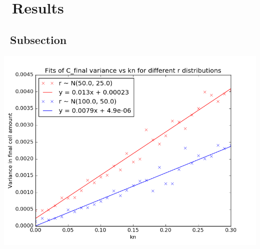 \graphicspath{{images/}}

\section{\thesection~Results}
\label{sec:results}
\citep{palkova1997}

\subsection{\thesubsection~Subsection}


\graphicspath{{images/guessing/}}
\begin{Figure}
  \centering
  \includegraphics[width=\linewidth]{final/kn_guessing}
  \label{fig:kn_guessing}
\end{Figure}


